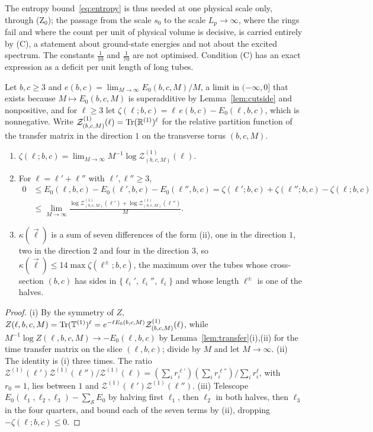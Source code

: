 The entropy bound~\eqref{eq:entropy} is thus needed at one physical scale
only, through (Z$_0$); the passage from the scale $s_0$ to the scale
$L_p\to\infty$, where the rings fail and where the count per unit of
physical volume is decisive, is carried entirely by (C), a statement about
ground-state energies and not about the excited spectrum. The constants
$\frac1{10}$ and $\frac1{70}$ are not optimised. Condition (C) has an exact
expression as a deficit per unit length of long tubes.

\begin{lemma}\label{lem:tubes}
Let $b,c\ge3$ and $e(b,c)=\lim_{M\to\infty}E_0(b,c,M)/M$, a limit in
$(-\infty,0]$ that exists because $M\mapsto E_0(b,c,M)$ is superadditive by
Lemma~\ref{lem:cutside} and nonpositive, and for $\ell\ge3$ let
$\zeta(\ell;b,c)=\ell\,e(b,c)-E_0(\ell,b,c)$, which is nonnegative. Write
$\mathcal Z^{(1)}_{(b,c,M)}(\ell)=\operatorname{Tr}(\mathbb R^{(1)})^\ell$ for the relative
partition function of the transfer matrix in the direction $1$ on the
transverse torus $(b,c,M)$.
\begin{enumerate}[label=\textup{(\roman*)},leftmargin=*]
\item $\zeta(\ell;b,c)=\lim_{M\to\infty}M^{-1}\log\mathcal Z^{(1)}_{(b,c,M)}
(\ell)$.
\item For $\ell=\ell'+\ell''$ with $\ell',\ell''\ge3$,
\begin{align*}
0&\le E_0(\ell,b,c)-E_0(\ell',b,c)-E_0(\ell'',b,c)=\zeta(\ell';b,c)+\zeta(\ell''
;b,c)-\zeta(\ell;b,c)\\
&\le\lim_{M\to\infty}\frac{\log\mathcal Z^{(1)}_{(b,c,M)}(\ell')+\log
\mathcal Z^{(1)}_{(b,c,M)}(\ell'')}{M}.
\end{align*}
\item $\kappa(\vec\ell)$ is a sum of seven differences of the form \textup{(ii)},
one in the direction $1$, two in the direction $2$ and four in the direction
$3$, so $\kappa(\vec\ell)\le14\max\zeta(\ell^\pm;b,c)$, the maximum over the
tubes whose cross-section $(b,c)$ has sides in $\{\ell_i',\ell_i'',\ell_i\}$
and whose length $\ell^\pm$ is one of the halves.
\end{enumerate}
\end{lemma}

\begin{proof}
(i) By the symmetry of $Z$, $Z(\ell,b,c,M)=\operatorname{Tr}(\mathbb T^{(1)})^\ell=
e^{-\ell E_0(b,c,M)}\mathcal Z^{(1)}_{(b,c,M)}(\ell)$, while $M^{-1}\log Z(\ell,
b,c,M)\to-E_0(\ell,b,c)$ by Lemma~\ref{lem:transfer}(i),(ii) for the time
transfer matrix on the slice $(\ell,b,c)$; divide by $M$ and let $M\to\infty$.
(ii) The identity is (i) three times. The ratio $\mathcal Z^{(1)}(\ell')
\mathcal Z^{(1)}(\ell'')/\mathcal Z^{(1)}(\ell)=(\sum_ir_i^{\ell'})(\sum_i
r_i^{\ell''})/\sum_ir_i^{\ell}$, with $r_0=1$, lies between $1$ and
$\mathcal Z^{(1)}(\ell')\mathcal Z^{(1)}(\ell'')$. (iii) Telescope
$E_0(\ell_1,\ell_2,\ell_3)-\sum_{\mathcal S}E_0$ by halving first $\ell_1$,
then $\ell_2$ in both halves, then $\ell_3$ in the four quarters, and bound
each of the seven terms by (ii), dropping $-\zeta(\ell;b,c)\le0$.
\end{proof}

